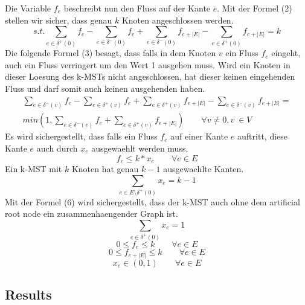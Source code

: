 \documentclass[a4paper,10pt]{article}
\begin{document}
Die Variable $f_e$ beschreibt nun  den Fluss auf der Kante $e$. Mit der Formel (2)
stellen wir sicher, dass genau $k$ Knoten angeschlossen werden.
\begin{equation}
s.t.  \sum_{e \in \delta^{+}(0)} f_e - \sum_{e \in \delta^{-}(0)} f_e + \sum_{e \in \delta^{-}(0)} f_{e+|E|} - \sum_{e \in \delta^{+}(0)} f_{e+|E|} = k
\end{equation}
Die folgende Formel (3) besagt, dass falls in dem Knoten $v$ ein Fluss $f_e$ eingeht, 
auch ein Fluss verringert um den Wert 1 ausgehen muss. Wird ein Knoten in dieser Loesung
des k-MSTs nicht angeschlossen, hat dieser keinen eingehenden Fluss und darf somit auch
keinen ausgehenden haben.
\begin{eqnarray}
\sum_{e \in \delta^{-}(v)} f_e - \sum_{e \in \delta^{+}(v)} f_e + \sum_{e \in \delta^{+}(v)} f_{e+|E|} - \sum_{e \in \delta^{-}(v)} f_{e+|E|} = \nonumber \\ min(1,\sum_{e \in \delta^{-}(v)}f_e + \sum_{e \in \delta^{+}(v)} f_{e+|E|}) \qquad  \forall v \not = 0, v \ \in V 
\end{eqnarray}
Es wird sichergestellt, dass falls ein Fluss $f_e$ auf einer Kante $e$ auftritt, diese
Kante $e$ auch durch $x_e$ ausgewaehlt werden muss. 
\begin{equation}
f_e \leq k * x_e \qquad \forall e \in E 
\end{equation}
Ein k-MST mit $k$ Knoten hat genau $k-1$ ausgewaehlte Kanten.
\begin{equation}
\sum_{e \in E\setminus \delta^{+}(0)} x_e = k-1 
\end{equation}
Mit der Formel (6) wird sichergestellt, dass der k-MST auch ohne dem
artificial root node ein zusammenhaengender Graph ist.
\begin{equation}
\sum_{e \in \delta^{+}(0)} x_e = 1 
\end{equation}
\begin{equation}
0 \leq f_e \leq k \qquad \forall e \in E
\end{equation}
\begin{equation}
0 \leq f_{e+|E|} \leq k \qquad \forall e \in E
\end{equation}
\begin{equation}
x_e \in (0,1) \qquad \forall e \in E
\end{equation}

\subsection*{Results}
\end{document}
